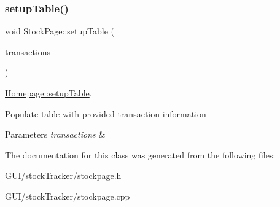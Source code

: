 \subsubsection{\texorpdfstring{setup\+Table()}{setupTable()}}
{\footnotesize\ttfamily void Stock\+Page\+::setup\+Table (\begin{DoxyParamCaption}\item[{std\+::vector$<$ \mbox{\hyperlink{class_transaction_type}{Transaction\+Type}} $>$}]{transactions }\end{DoxyParamCaption})}



\mbox{\hyperlink{class_homepage_a8eeedb7e3e7b6144d7878e9525aad0ab}{Homepage\+::setup\+Table}}. 

Populate table with provided transaction information


\begin{DoxyParams}{Parameters}
{\em transactions} & \\
\hline
\end{DoxyParams}


The documentation for this class was generated from the following files\+:\begin{DoxyCompactItemize}
\item 
G\+U\+I/stock\+Tracker/stockpage.\+h\item 
G\+U\+I/stock\+Tracker/stockpage.\+cpp\end{DoxyCompactItemize}

